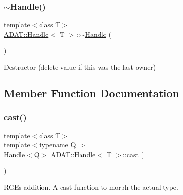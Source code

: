 \subsubsection{\texorpdfstring{$\sim$Handle()}{~Handle()}\hspace{0.1cm}{\footnotesize\ttfamily [3/3]}}
{\footnotesize\ttfamily template$<$class T$>$ \\
\mbox{\hyperlink{classADAT_1_1Handle}{A\+D\+A\+T\+::\+Handle}}$<$ T $>$\+::$\sim$\mbox{\hyperlink{classADAT_1_1Handle}{Handle}} (\begin{DoxyParamCaption}{ }\end{DoxyParamCaption})\hspace{0.3cm}{\ttfamily [inline]}}



Destructor (delete value if this was the last owner) 



\subsection{Member Function Documentation}
\mbox{\label{classADAT_1_1Handle_aac9634a0530419244ef076e63ff2b984}} 
\subsubsection{\texorpdfstring{cast()}{cast()}\hspace{0.1cm}{\footnotesize\ttfamily [1/3]}}
{\footnotesize\ttfamily template$<$class T$>$ \\
template$<$typename Q $>$ \\
\mbox{\hyperlink{classADAT_1_1Handle}{Handle}}$<$Q$>$ \mbox{\hyperlink{classADAT_1_1Handle}{A\+D\+A\+T\+::\+Handle}}$<$ T $>$\+::cast (\begin{DoxyParamCaption}{ }\end{DoxyParamCaption})\hspace{0.3cm}{\ttfamily [inline]}}



R\+GE\textquotesingle{}s addition. A cast function to morph the actual type. 

\mbox{\label{classADAT_1_1Handle_aac9634a0530419244ef076e63ff2b984}} 
